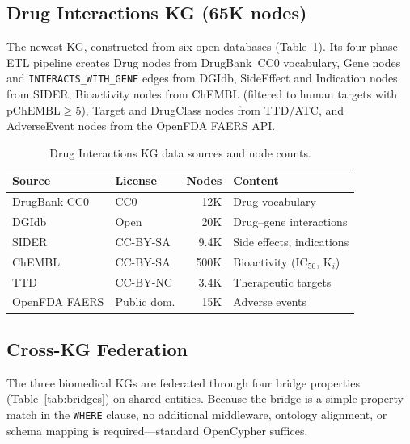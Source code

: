\documentclass[sigconf]{acmart}
\begin{document}
\subsection{Drug Interactions KG (65K nodes)}
The newest KG, constructed from six open databases
(Table~\ref{tab:drugkg}).  Its four-phase ETL pipeline creates Drug
nodes from DrugBank~CC0 vocabulary, Gene nodes and
\texttt{INTERACTS\_WITH\_GENE} edges from DGIdb, SideEffect and
Indication nodes from SIDER, Bioactivity nodes from ChEMBL (filtered
to human targets with $\text{pChEMBL} \geq 5$), Target and DrugClass
nodes from TTD/ATC, and AdverseEvent nodes from the OpenFDA FAERS API.

\begin{table}[t]
\centering
\caption{Drug Interactions KG data sources and node counts.}
\label{tab:drugkg}
\small
\begin{tabular}{@{}llrl@{}}
\toprule
\textbf{Source} & \textbf{License} & \textbf{Nodes} & \textbf{Content} \\
\midrule
DrugBank CC0  & CC0         & 12K & Drug vocabulary \\
DGIdb         & Open        & 20K & Drug--gene interactions \\
SIDER         & CC-BY-SA    & 9.4K & Side effects, indications \\
ChEMBL        & CC-BY-SA    & 500K & Bioactivity (IC$_{50}$, K$_i$) \\
TTD           & CC-BY-NC    & 3.4K & Therapeutic targets \\
OpenFDA FAERS & Public dom. & 15K  & Adverse events \\
\bottomrule
\end{tabular}
\end{table}

\subsection{Cross-KG Federation}\label{sec:federation}

The three biomedical KGs are federated through four bridge properties
(Table~\ref{tab:bridges}) on shared entities.  Because the bridge
is a simple property match in the \texttt{WHERE} clause, no
additional middleware, ontology alignment, or schema mapping is
required---standard OpenCypher suffices.
\end{document}
